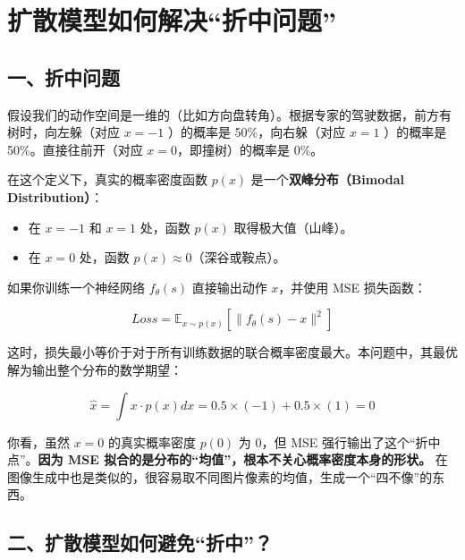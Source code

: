 \setcounter{section}{4}

\hypertarget{ux6269ux6563ux6a21ux578bux5982ux4f55ux89e3ux51b3ux6298ux4e2dux95eeux9898}{%
\section{扩散模型如何解决``折中问题''}\label{ux6269ux6563ux6a21ux578bux5982ux4f55ux89e3ux51b3ux6298ux4e2dux95eeux9898}}

\hypertarget{ux4e00ux6298ux4e2dux95eeux9898}{%
\subsection{一、折中问题}\label{ux4e00ux6298ux4e2dux95eeux9898}}

假设我们的动作空间是一维的（比如方向盘转角）。根据专家的驾驶数据，前方有树时，向左躲（对应 \(x=-1\) ）的概率是 50\%，向右躲（对应 \(x=1\) ）的概率是 50\%。直接往前开（对应 \(x=0\)，即撞树）的概率是 0\%。

在这个定义下，真实的概率密度函数 \(p(x)\) 是一个\textbf{双峰分布（Bimodal Distribution）}：

\begin{itemize}
\tightlist
\item
  在 \(x=-1\) 和 \(x=1\) 处，函数 \(p(x)\) 取得极大值（山峰）。
\item
  在 \(x=0\) 处，函数 \(p(x)\approx 0\)（深谷或鞍点）。
\end{itemize}

如果你训练一个神经网络 \(f_\theta(s)\) 直接输出动作 \(x\)，并使用 MSE 损失函数：

\[
Loss=\mathbb{E}_{x\sim p(x)}\left[\lVert f_\theta(s)-x\rVert^2\right]
\]

这时，损失最小等价于对于所有训练数据的联合概率密度最大。本问题中，其最优解为输出整个分布的数学期望：

\[
\hat{x}=\int x\cdot p(x)dx=0.5\times(-1)+0.5\times(1)=0
\]

你看，虽然 \(x=0\) 的真实概率密度 \(p(0)\) 为 0，但 MSE 强行输出了这个``折中点''。\textbf{因为 MSE 拟合的是分布的``均值''，根本不关心概率密度本身的形状。}
在图像生成中也是类似的，很容易取不同图片像素的均值，生成一个``四不像''的东西。

\hypertarget{ux4e8cux6269ux6563ux6a21ux578bux5982ux4f55ux907fux514dux6298ux4e2d}{%
\subsection{二、扩散模型如何避免``折中''？}\label{ux4e8cux6269ux6563ux6a21ux578bux5982ux4f55ux907fux514dux6298ux4e2d}}

